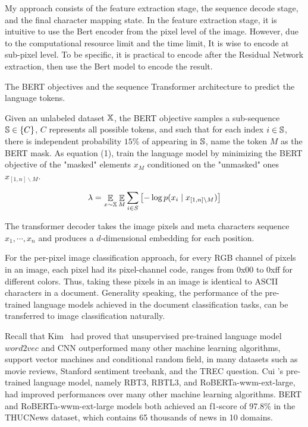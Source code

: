 \documentclass[review]{cvpr}
\begin{document}
My approach consists of the feature extraction stage, the sequence decode stage, and the final character mapping state.
In the feature extraction stage, it is intuitive to use the Bert encoder from the pixel level of the image.
However, due to the computational resource limit and the time limit,
It is wise to encode at sub-pixel level.
To be specific, it is practical to encode after the Residual Network extraction, then use the Bert model to encode the result.

The BERT objectives and the sequence Transformer architecture to predict the language tokens.

\par Given an unlabeled dataset $\Bbb X$, the BERT objective samples a sub-sequence $\Bbb S \in \{C\}$,
$C$ represents all possible tokens, and such that for each index $i \in \Bbb S$,
there is independent probability $15\%$ of appearing in $\Bbb S$,
name the token $M$ as the BERT mask.
As equation (1), train the language model by minimizing the BERT objective of the "masked" elements $x_M$
conditioned on the "unmasked" ones $x_{\left[1,n\right]\backslash M}$.

\begin{equation}
  \lambda = \mathop{\Bbb E}\limits_{x\sim\Bbb X} \mathop{\Bbb E}\limits_{M} \sum_{i\in S}{\bigl[-\log{p(x_i\mid x_{\left[1,n \right]\backslash M})\bigr]}}
\end{equation}

\par The transformer decoder takes the image pixels and meta characters sequence $x_1,\cdots,x_n$ and produces a $d$-dimensional
embedding for each position.

For the per-pixel image classification approach, for every RGB channel of pixels in an image,
each pixel had its pixel-channel code, ranges from 0x00 to 0xff for different colors.
Thus, taking these pixels in an image is identical to ASCII characters in a document.
Generality speaking, the performance of the pre-trained language models achieved in the document classification tasks, can be transferred to image classification naturally.

\par Recall that Kim~\cite{kim2014convolutional} had proved that unsupervised pre-trained language model $word2vec$ and CNN outperformed many other machine learning algorithms,
\eg support vector machines and conditional random field, in many datasets such as movie reviews, Stanford sentiment treebank, and the TREC question.
Cui \etal's pre-trained language model, namely RBT3, RBTL3, and RoBERTa-wwm-ext-large, had improved performances over many other machine learning algorithms.
BERT and RoBERTa-wwm-ext-large models both achieved an f1-score of 97.8\% in the THUCNews dataset, which contains 65 thousands of news in 10 domains.
\end{document}
